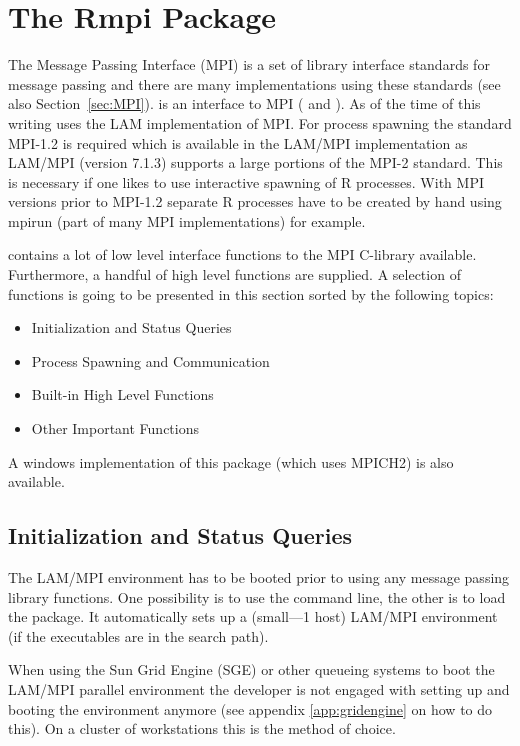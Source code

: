 \section{The Rmpi Package}
\label{sec:Rmpi}
The Message Passing Interface (MPI) is a set of library interface
standards for message passing and there are many implementations using
these standards (see also Section~\ref{sec:MPI}).
 is an interface to MPI (\cite{yu02Rmpi} and
\cite{yu06Rmpi}). As 
of the time of this writing  uses
the LAM implementation of MPI. For process spawning the standard
MPI-1.2 is required which is available in the LAM/MPI implementation 
as LAM/MPI (version 7.1.3) supports a large portions of the MPI-2
standard. This is necessary if one likes to use interactive spawning
of R processes. With MPI versions prior to MPI-1.2 separate R
processes have to be created by hand using mpirun (part of many MPI
implementations) for example.

 contains a lot of low level interface functions to the MPI
C-library available. 
Furthermore, a handful of high level functions are supplied. A
selection of functions is going to be presented in this section sorted
by the following topics:

\begin{itemize}
\item Initialization and Status Queries
\item Process Spawning and Communication
\item Built-in High Level Functions
\item Other Important Functions
\end{itemize}  

A windows implementation of this package (which uses MPICH2)
is also available.

\subsection{Initialization and Status Queries}

The LAM/MPI environment has to be booted prior to using any
message passing library functions. One possibility is to use the
command line, the other is to load the  package. It automatically
sets up a (small---1 host) LAM/MPI environment (if the executables are
in the search path). 

When using the Sun Grid Engine (SGE) or other queueing systems to boot
the LAM/MPI parallel environment the developer is not engaged with
setting up and booting the environment anymore (see
appendix \ref{app:gridengine} on how to do this). On a cluster of
workstations this is the method of choice. 


